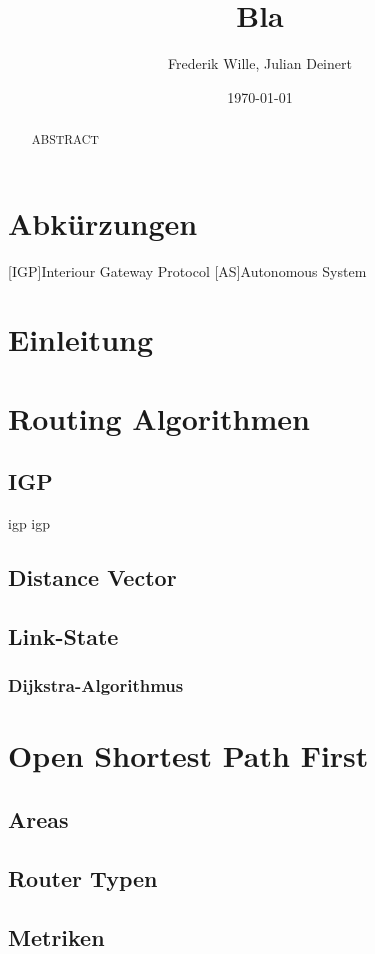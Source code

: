 \documentclass[1pt,a4paper,final]{article}
\title{\LARGE \bf
Bla
}
\author{Frederik Wille, Julian Deinert}
\date{\today}
\begin{document}

\maketitle
\thispagestyle{empty}
\newpage
\thispagestyle{empty}
\tableofcontents
\newpage
\setcounter{page}{1}

\section*{Abkürzungen}
\begin{acronym}
		[IGP]{Interiour Gateway Protocol}
		[AS]{Autonomous System}
\end{acronym}
\newpage
\begin{abstract}
ABSTRACT

\end{abstract}

\section{Einleitung}
\section{Routing Algorithmen}
\subsection{IGP}
\ac{igp} \ac{igp}
\subsection{Distance Vector}
\subsection{Link-State}
\subsubsection{Dijkstra-Algorithmus}
\section{Open Shortest Path First}
\subsection{Areas}
\subsection{Router Typen}
\subsection{Metriken}

\clearpage
\nocite{*}
\printbibliography
\end{document}
